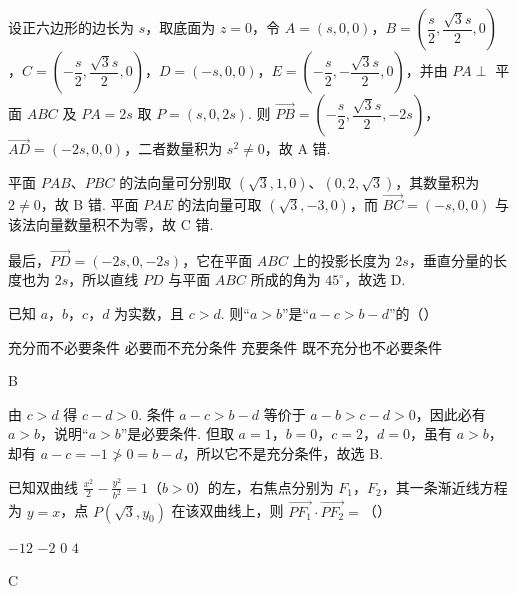 \begin{solution}
设正六边形的边长为 \(s\)，取底面为 \(z=0\)，令
\(A=(s,0,0)\)，\(B=\left(\dfrac{s}{2},\dfrac{\sqrt{3}s}{2},0\right)\)，\(C=\left(-\dfrac{s}{2},\dfrac{\sqrt{3}s}{2},0\right)\)，\(D=(-s,0,0)\)，\(E=\left(-\dfrac{s}{2},-\dfrac{\sqrt{3}s}{2},0\right)\)，并由 \(PA\perp\) 平面 \(ABC\) 及 \(PA=2s\) 取 \(P=(s,0,2s)\). 则
\(\overrightarrow{PB}=\left(-\dfrac{s}{2},\dfrac{\sqrt{3}s}{2},-2s\right)\)，\(\overrightarrow{AD}=(-2s,0,0)\)，二者数量积为 \(s^2\ne0\)，故 A 错.

平面 \(PAB\)、\(PBC\) 的法向量可分别取 \((\sqrt{3},1,0)\)、\((0,2,\sqrt{3})\)，其数量积为 \(2\ne0\)，故 B 错. 平面 \(PAE\) 的法向量可取 \((\sqrt{3},-3,0)\)，而 \(\overrightarrow{BC}=(-s,0,0)\) 与该法向量数量积不为零，故 C 错.

最后，\(\overrightarrow{PD}=(-2s,0,-2s)\)，它在平面 \(ABC\) 上的投影长度为 \(2s\)，垂直分量的长度也为 \(2s\)，所以直线 \(PD\) 与平面 \(ABC\) 所成的角为 \(45^{\circ}\)，故选 D.
\end{solution}

\begin{problem}
已知 \(a\)，\(b\)，\(c\)，\(d\) 为实数，且 \(c > d\). 则“\(a > b\)”是“\(a - c > b - d\)”的（\quad）

\choices
    {充分而不必要条件}
    {必要而不充分条件}
    {充要条件}
    {既不充分也不必要条件}
\end{problem}

\begin{answer}
B
\end{answer}

\begin{solution}
由 \(c>d\) 得 \(c-d>0\). 条件 \(a-c>b-d\) 等价于 \(a-b>c-d>0\)，因此必有 \(a>b\)，说明“\(a>b\)”是必要条件. 但取 \(a=1\)，\(b=0\)，\(c=2\)，\(d=0\)，虽有 \(a>b\)，却有 \(a-c=-1\not>0=b-d\)，所以它不是充分条件，故选 B.
\end{solution}

\begin{problem}
已知双曲线 \(\frac{x^2}{2} - \frac{y^2}{b^2} = 1\)（\(b > 0\)）的左，右焦点分别为 \(F_1\)，\(F_2\)，其一条渐近线方程为 \(y = x\)，点 \(P(\sqrt{3}, y_0)\) 在该双曲线上，则 \(\overrightarrow{PF_1} \cdot \overrightarrow{PF_2} =\)（\quad）

\choices
    {\(-12\)}
    {\(-2\)}
    {\(0\)}
    {\(4\)}
\end{problem}

\begin{answer}
C
\end{answer}

